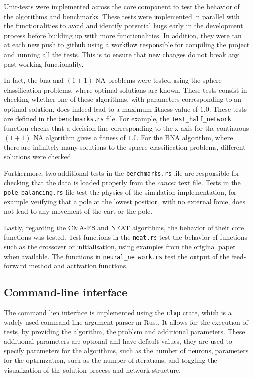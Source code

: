Unit-tests were implemented across the core component to test the behavior of the algorithms and benchmarks.
These tests were implemented in parallel with the functionalities to avoid and identify potential bugs early in the development process before
building up with more functionalities. In addition, they were ran at each new push to github using a workflow responsible for compiling the project
and running all the tests. This is to ensure that new changes do not break any past working functionality.

In fact, the bna and $(1 + 1)$ NA problems were tested using the sphere classification problems, where optimal solutions are known. These tests
consist in checking whether one of these algorithms, with parameters corresponding to an optimal solution, does indeed lead to a maximum fitness value
of $1.0$. These tests are defined in the \texttt{benchmarks.rs} file. For example, the \texttt{test\_half\_network} function checks that a decision line
corresponding to the x-axis for the continuous $(1 + 1)$ NA algorithm gives a fitness of $1.0$. For the BNA algorithm, where there are infinitely many
solutions to the sphere classification problems, different solutions were checked.

Furthermore, two additional tests in the \texttt{benchmarks.rs} file are responsible for checking that the data is loaded properly from the \textit{cancer}
text file. Tests in the \texttt{pole\_balancing.rs} file test the physics of the simulation implementation, for example verifying that a pole at the lowest
position, with no external force, does not lead to any movement of the cart or the pole.

Lastly, regarding the CMA-ES and NEAT algorithms, the behavior of their core functions was tested. Test functions in the \texttt{neat.rs} test the
behavior of functions such as the crossover or initialization, using examples from the original paper \cite{...} when available. The functions in
\texttt{neural\_network.rs} test the output of the feed-forward method and activation functions.

\subsection{Command-line interface}

The command lien interface is implemented using the \texttt{clap} crate, which is a widely used command line argument parser in Rust.
It allows for the execution of tests, by providing the algorithm, the problem and additional parameters. These additional parameters are optional and have
default values, they are used to specify parameters for the algorithms, such as the number of neurons, parameters for the optimization, such as the number of
iterations, and toggling the visualization of the solution process and network structure.

